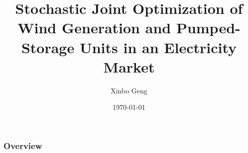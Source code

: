 




\title[Slides for Power Reading Group]{Stochastic Joint Optimization of Wind Generation and Pumped-Storage Units in an Electricity Market} %

\author{Xinbo Geng} %
\date{\today} %



\begin{frame}
\titlepage %
\end{frame}

\begin{frame}
\frametitle{Overview} %
\tableofcontents %
\end{frame}



